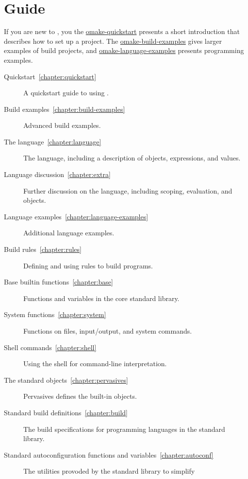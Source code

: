 %
\chapter{Guide}
\label{chapter:omake}
\label{section:guide}

If you are new to \OMake{}, you the \href{omake-quickstart.html}{omake-quickstart} presents a short
introduction that describes how to set up a project.  The
\href{omake-build-examples.html}{omake-build-examples} gives larger examples of build projects, and
\href{omake-language-examples.html}{omake-language-examples} presents programming examples.

\begin{description}
\item[Quickstart~\ref{chapter:quickstart}]
%
   A quickstart guide to using .
\item[Build examples~\ref{chapter:build-examples}]
%
   Advanced build examples.
\item[The \OMake{} language~\ref{chapter:language}]
%
   The  language, including a description of objects, expressions, and values.
\item[Language discussion~\ref{chapter:extra}]
%
   Further discussion on the language, including scoping, evaluation, and objects.
\item[Language examples~\ref{chapter:language-examples}]
%
   Additional language examples.
\item[Build rules~\ref{chapter:rules}]
%
   Defining and using rules to build programs.
\item[Base builtin functions~\ref{chapter:base}]
%
   Functions and variables in the core standard library.
\item[System functions~\ref{chapter:system}]
%
   Functions on files, input/output, and system commands.
\item[Shell commands~\ref{chapter:shell}]
%
   Using the  shell for command-line interpretation.
\item[The standard objects~\ref{chapter:pervasives}]
%
   Pervasives defines the built-in objects.
\item[Standard build definitions~\ref{chapter:build}]
%
   The build specifications for programming languages in the \OMake{} standard library.
\item[Standard autoconfiguration functions and variables~\ref{chapter:autoconf}]
%
   The utilities provoded by the \OMake{} standard library to simplify

\end{description}
